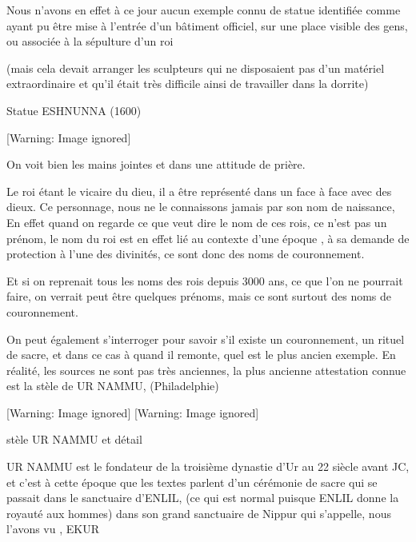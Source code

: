 \documentclass[a4paper,10pt]{article}
\begin{document}
\begin{itemize}
Nous n'avons en effet à ce jour aucun exemple connu de
statue identifiée comme ayant pu être mise à l'entrée
d'un bâtiment officiel, sur une place visible des
gens, ou associée à la sépulture d'un roi

(mais cela devait arranger les sculpteurs qui ne disposaient pas
d'un matériel extraordinaire et qu'il
était très difficile ainsi de travailler dans la dorrite)

Statue ESHNUNNA (1600) 

  [Warning: Image ignored] %
 

On voit bien les mains jointes et dans une attitude de prière.

Le roi étant le vicaire du dieu, il a  être représenté dans un face à
face avec des dieux. Ce personnage, nous ne le connaissons jamais par
son nom de naissance,  En effet quand on regarde ce que veut dire le
nom de ces rois, ce n'est pas un prénom, le nom du roi
est en effet lié au contexte d'une époque , à sa
demande de protection à l'une des divinités, ce sont
donc des noms de couronnement.

Et si on reprenait tous les noms des rois depuis 3000 ans, ce que
l'on ne pourrait faire, on verrait peut être quelques
prénoms, mais ce sont surtout des noms de couronnement.

On peut également s'interroger pour savoir
s'il existe un couronnement, un rituel de sacre, et
dans ce cas à quand il remonte, quel est le plus ancien exemple.  En
réalité, les sources ne sont pas très anciennes, la plus ancienne
attestation connue est la stèle de UR NAMMU, (Philadelphie)

  [Warning: Image ignored] %
   [Warning: Image ignored] %
 

stèle UR NAMMU et détail

UR NAMMU est le fondateur de la troisième dynastie d'Ur
au 22 siècle avant JC, et c'est à cette époque que les
textes parlent d'un cérémonie de sacre qui se passait
dans le sanctuaire d'ENLIL, (ce qui est normal puisque
ENLIL donne la royauté aux hommes) dans son grand sanctuaire de Nippur
qui s'appelle, nous l'avons vu , EKUR


\end{itemize}
\end{document}
